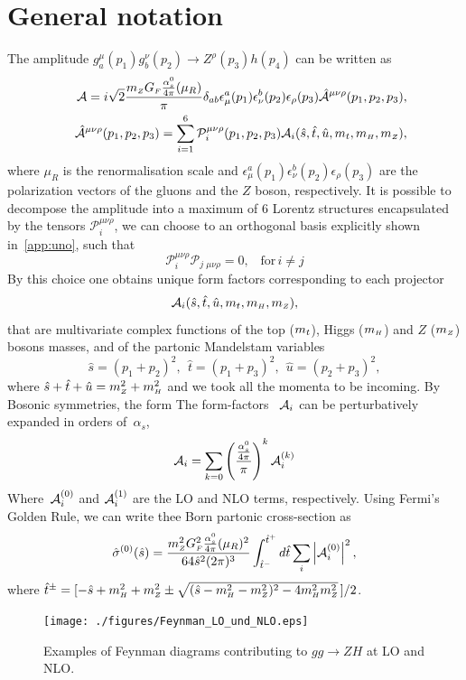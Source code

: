 \section{General notation \label{chap6sec:GenNot} }
The amplitude  $g^\mu_a(p_1)g^\nu_b(p_2)\to Z^\rho(p_3) h(p_4)$ can be written as
\begin{align}
&&{\cal A}=i \sqrt{2}\frac{m_{ \scriptscriptstyle Z} G_{ \scriptscriptstyle F} \frac{\alpha_s^0}{4 \pi}(\mu_R)}{\pi}\delta_{ab}\epsilon^a_\mu(p_1)
\epsilon^b_\nu(p_2)\epsilon_\rho(p_3)\hat{{\cal A}}^{\mu\nu\rho}(p_1,p_2,p_3 ),\\
&&\hat{{\cal A}}^{\mu\nu\rho}(p_1,p_2,p_3 )=\sum_{i=1}^{6}
\mathcal{P}_i^{\mu\nu\rho}(p_1,p_2,p_3 )
{\cal A}_i(\hat{s},\hat{t},\hat{u},m_t,m_{ \scriptscriptstyle H},m_{ \scriptscriptstyle Z}),
\label{eq:amp}
\end{align}
where  $\mu_R$ is the renormalisation scale and
$\epsilon^a_\mu(p_1)\epsilon^b_\nu(p_2)\epsilon_\rho(p_3)$ are the
polarization vectors of the gluons and the $Z$ boson, respectively.  It is possible to decompose the amplitude into a maximum of $6$ Lorentz structures encapsulated by the 
tensors $\mathcal{P}_i^{\mu\nu\rho}$, we can choose to an orthogonal basis explicitly shown in~\autoref{app:uno}, such that
\begin{equation}
	\mathcal{P}_i^{\mu\nu\rho} \mathcal{P}_j\,_{\mu\nu\rho} = 0, \,\,\, \,\, \text{for}\, i \neq j 
\end{equation}
By this choice one obtains unique form factors corresponding to each projector
\begin{equation}
{\cal A}_i(\hat{s},\hat{t},\hat{u},m_t,m_{ \scriptscriptstyle H},m_{ \scriptscriptstyle Z}),
\end{equation}
 that are multivariate complex functions of the
top ($m_t$), Higgs ($m_{ \scriptscriptstyle H}$) and $Z$ ($m_{ \scriptscriptstyle Z}$) bosons masses, and of
the partonic Mandelstam variables
\begin{equation}
\hat{s}=(p_1+p_2)^2,~~ \hat{t}=(p_1+p_3)^2,~~ \hat{u}=(p_2+p_3)^2,
\end{equation}
where $\hat{s}+\hat{t}+\hat{u}=m_{ \scriptscriptstyle Z}^2+m_{ \scriptscriptstyle H}^2$ and we took all the momenta to
be incoming. By Bosonic symmetries, the form
The form-factors~ ${\cal A}_i$ can be perturbatively expanded in orders of~$\alpha_s$, 
\begin{equation}
{\cal A}_{i} = \sum_{k=0} \left(\frac{\frac{\alpha_s^0}{4 \pi}}{\pi} \right) ^k {\cal A}_i^{(k)}
\label{eq:ampexp}
\end{equation}
Where~${\cal A}_i^{(0)}$ and ${\cal A}_i^{(1)}$ are the LO and NLO terms, respectively. Using Fermi's Golden Rule, we can write thee Born partonic cross-section as
\begin{equation}
\hat{\sigma}^{(0)}(\hat{s})=
\frac{m_{ \scriptscriptstyle Z}^2 G_{ \scriptscriptstyle F}^2 \frac{\alpha_s^0}{4 \pi}(\mu_R)^2}{64 \hat{s}^2(2\pi)^3}
\int^{\hat{t}^+}_{\hat{t}^-}d\hat{t}\sum_i \left|{\cal A}_i^{(0)}\right|^2,
\end{equation}
where
$\hat{t}^\pm=[-\hat{s}+m_{ \scriptscriptstyle H}^2+m_{ \scriptscriptstyle Z}^2\pm\sqrt{(\hat{s}-m_{ \scriptscriptstyle H}^2-m_{ \scriptscriptstyle Z}^2)^2-4m_{ \scriptscriptstyle H}^2m_{ \scriptscriptstyle Z}^2}\,]/2$.
\begin{figure}
	\begin{center}
		\texttt{[image: ./figures/Feynman\_LO\_und\_NLO.eps]}
		\caption{Examples of Feynman diagrams contributing to $gg \to ZH$ at  LO and
			NLO.}
		\label{fig:dia}
	\end{center}
\end{figure}

